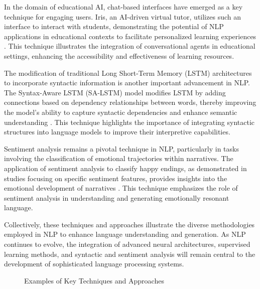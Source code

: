 In the domain of educational AI, chat-based interfaces have emerged as a key technique for engaging users. Iris, an AI-driven virtual tutor, utilizes such an interface to interact with students, demonstrating the potential of NLP applications in educational contexts to facilitate personalized learning experiences \cite{bassner2024irisaidrivenvirtualtutor}. This technique illustrates the integration of conversational agents in educational settings, enhancing the accessibility and effectiveness of learning resources.



The modification of traditional Long Short-Term Memory (LSTM) architectures to incorporate syntactic information is another important advancement in NLP. The Syntax-Aware LSTM (SA-LSTM) model modifies LSTM by adding connections based on dependency relationships between words, thereby improving the model's ability to capture syntactic dependencies and enhance semantic understanding \cite{qian2017syntaxawarelstmmodel}. This technique highlights the importance of integrating syntactic structures into language models to improve their interpretive capabilities.



Sentiment analysis remains a pivotal technique in NLP, particularly in tasks involving the classification of emotional trajectories within narratives. The application of sentiment analysis to classify happy endings, as demonstrated in studies focusing on specific sentiment features, provides insights into the emotional development of narratives \cite{jannidis2016analyzingfeaturesdetectionhappy}. This technique emphasizes the role of sentiment analysis in understanding and generating emotionally resonant language.



Collectively, these techniques and approaches illustrate the diverse methodologies employed in NLP to enhance language understanding and generation. As NLP continues to evolve, the integration of advanced neural architectures, supervised learning methods, and syntactic and sentiment analysis will remain central to the development of sophisticated language processing systems.






{
\begin{figure}[ht!]
\centering
{}\hspace{0.03\textwidth}
\hspace{0.03\textwidth}
\caption{Examples of Key Techniques and Approaches}\label{fig:retrieve_fig_3}
\end{figure}
}


